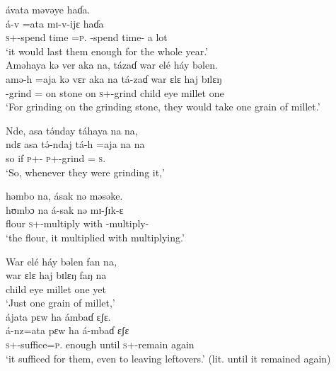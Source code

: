 \medskip
 ávata  məvəye  haɗa.  \\
\gll á-v    =ata  mɪ-v-ijɛ         haɗa\\
\textsc{s}+{\IFV}-{spend time}  =\textsc{p}.{\IO}   {\NOM}-{spend time}-{\CL}  {a lot}\\
\glt ‘it would last them enough for the whole year.’  \\
\z
\ea    Aməhaya  kə  ver  aka  na,  tázaɗ  war  elé  háy  bəlen.\\
\gll amə-h  =aja   kə   vɛr   aka  na  tá-zaɗ       war   ɛlɛ  haj  bɪlɛŋ\\
{\DEP}-grind  ={\PLU}  on   stone   on    {\PSP}  \textsc{s}+{\IFV}-grind  child   eye   millet    one\\
\glt ‘For grinding on the grinding stone, they would take one grain of millet.’\\
\z

\ea    Nde,  asa  t\'ənday  táhaya  na  na,    \\
\gll ndɛ  asa t\'ə-ndaj    tá-h =aja      na  na\\
so  if     \textsc{p}+{\IFV}-{\PRG}  \textsc{p}+{\IFV}-grind ={\PLU}  \textsc{s}.{\DO}  {\PSP}\\
\glt ‘So, whenever they were grinding it,’\\
\medskip

 həmbo  na, ásak  nə  məsəke.\\
\gll hʊmbɔ na á-sak nə mɪ-ʃɪk-ɛ\\
flour     {\PSP}  \textsc{s}+{\IFV}-multiply  with  {\NOM}{}-multiply-{\CL}\\
\glt ‘the flour, it multiplied with multiplying.’ \\
\z

\ea    War  elé  háy  bəlen  fan  na\textit,\\
\gll war     ɛlɛ   haj   bɪlɛŋ   faŋ   na\\
child   eye   millet   one    yet   {\PSP}\\
\glt ‘Just one grain of millet,’\\

\medskip
 ájata   pɛw  ha  ámbaɗ  ɛʃɛ.\\
\gll á-nz=ata                    pɛw   ha  á-mbaɗ    ɛʃɛ\\
 \textsc{s}+{\IFV}-suffice=\textsc{p}.{\IO}       enough   until     \textsc{s}+{\IFV}-remain   again\\
\glt ‘it sufficed for them, even to leaving leftovers.’ (lit. until it remained again)\\
\z

